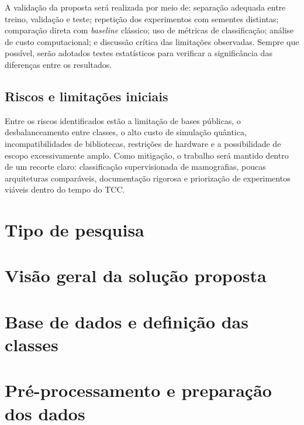 \documentclass[
    12pt,
    openright,
    oneside,
    a4paper,
    english,
    brazil
]{abntex2}
\begin{document}
A validação da proposta será realizada por meio de: separação adequada entre treino, validação e teste; repetição dos experimentos com sementes distintas; comparação direta com \textit{baseline} clássico; uso de métricas de classificação; análise de custo computacional; e discussão crítica das limitações observadas. Sempre que possível, serão adotados testes estatísticos para verificar a significância das diferenças entre os resultados.

\subsection*{Riscos e limitações iniciais}

Entre os riscos identificados estão a limitação de bases públicas, o desbalanceamento entre classes, o alto custo de simulação quântica, incompatibilidades de bibliotecas, restrições de hardware e a possibilidade de escopo excessivamente amplo. Como mitigação, o trabalho será mantido dentro de um recorte claro: classificação supervisionada de mamografias, poucas arquiteturas comparáveis, documentação rigorosa e priorização de experimentos viáveis dentro do tempo do TCC.

\section{Tipo de pesquisa}


\section{Visão geral da solução proposta}


\section{Base de dados e definição das classes}


\section{Pré-processamento e preparação dos dados}
\end{document}
